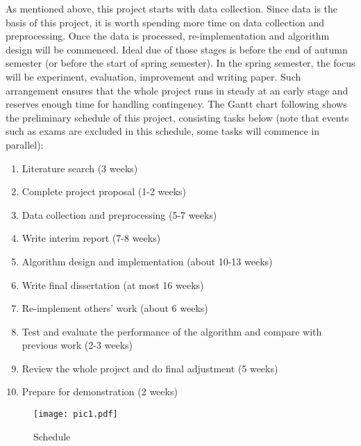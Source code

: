 As mentioned above, this project starts with data collection. Since data is the basis of this project, it is worth spending more time on data collection and preprocessing. Once the data is processed, re-implementation and algorithm design will be commenced. Ideal due of those stages is before the end of autumn semester (or before the start of spring semester). In the spring semester, the focus will be experiment, evaluation, improvement and writing paper. Such arrangement ensures that the whole project runs in steady at an early stage and reserves enough time for handling contingency. The Gantt chart following shows the preliminary schedule of this project, consisting tasks below (note that events such as exams are excluded in this schedule, some tasks will commence in parallel):
\begin{enumerate}
    \item Literature search (3 weeks)
    \item Complete project proposal (1-2 weeks)
    \item Data collection and preprocessing (5-7 weeks)
    \item Write interim report (7-8 weeks)
    \item Algorithm design and implementation (about 10-13 weeks)
    \item Write final dissertation (at most 16 weeks)
    \item Re-implement others’ work (about 6 weeks)
    \item Test and evaluate the performance of the algorithm and compare with previous work (2-3 weeks)
    \item Review the whole project and do final adjustment (5 weeks)
    \item Prepare for demonstration (2 weeks)
\end{enumerate}
	
\begin{figure}[htbp]
    \centering
    \texttt{[image: pic1.pdf]}
    \caption{Schedule}
    \label{fig1}
    \end{figure}
